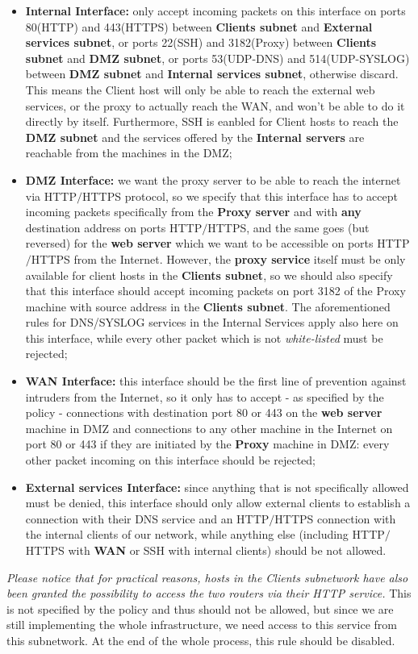 \begin{itemize}
\item \textbf{Internal Interface:} only accept incoming packets on this interface on ports 80(HTTP) and 443(HTTPS) between \textbf{Clients subnet} and \textbf{External services subnet}, or ports 22(SSH) and 3182(Proxy) between \textbf{Clients subnet} and \textbf{DMZ subnet}, or ports 53(UDP-DNS) and 514(UDP-SYSLOG) between \textbf{DMZ subnet} and \textbf{Internal services subnet}, otherwise discard. This means the Client host will only be able to reach the external web services, or the proxy to actually reach the WAN, and won't be able to do it directly by itself. Furthermore, SSH is eanbled for Client hosts to reach the \textbf{DMZ subnet} and the services offered by the \textbf{Internal servers} are reachable from the machines in the DMZ;
\item \textbf{DMZ Interface:} we want the proxy server to be able to reach the internet via HTTP$/$HTTPS protocol, so we specify that this interface has to accept incoming packets specifically from the \textbf{Proxy server} and with \textbf{any} destination address on ports HTTP$/$HTTPS, and the same goes (but reversed) for the \textbf{web server} which we want to be accessible on ports HTTP$/$HTTPS from the Internet. However, the \textbf{proxy service} itself must be only available for client hosts in the \textbf{Clients subnet}, so we should also specify that this interface should accept incoming packets on port 3182 of the Proxy machine with source address in the \textbf{Clients subnet}. The aforementioned rules for DNS/SYSLOG services in the Internal Services apply also here on this interface, while every other packet which is not \textit{white-listed} must be rejected;
\item \textbf{WAN Interface:} this interface should be the first line of prevention against intruders from the Internet, so it only has to accept - as specified by the policy - connections with destination port 80 or 443 on the \textbf{web server} machine in DMZ and connections to any other machine in the Internet on port 80 or 443 if they are initiated by the \textbf{Proxy} machine in DMZ: every other packet incoming on this interface should be rejected;
\item \textbf{External services Interface:} since anything that is not specifically allowed must be denied, this interface should only allow external clients to establish a connection with their DNS service and an HTTP$/$HTTPS connection with the internal clients of our network, while anything else (including HTTP$/$HTTPS with \textbf{WAN} or SSH with internal clients) should be not allowed.
\end{itemize}

\textit{Please notice that for practical reasons, hosts in the Clients subnetwork have also been granted the possibility to access the two routers via their HTTP service.} This is not specified by the policy and thus should not be allowed, but since we are still implementing the whole infrastructure, we need access to this service from this subnetwork. At the end of the whole process, this rule should be disabled.
